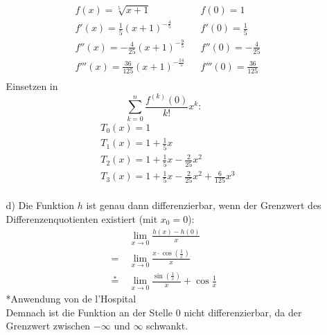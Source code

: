 \documentclass[a4paper,11pt]{article}
\begin{document}
\begin{enumerate}
\begin{enumerate}
                    \begin{align*}
                    &f(x) = \sqrt[5]{x+1} && f(0) = 1 \\
                    &f'(x) = \frac{1}{5}(x+1)^{-\frac{4}{5}} && f'(0) = \frac{1}{5} \\
                    &f''(x) = -\frac{4}{25}(x+1)^{-\frac{9}{5}} && f''(0) = -\frac{4}{25} \\
                    &f'''(x) = \frac{36}{125}(x+1)^{-\frac{14}{5}} && f'''(0) = \frac{36}{125} \\
                    \end{align*}
                    Einsetzen in $$\sum_{k=0}^{n} \frac{f^{(k)}(0)}{k!}x^k:$$ 
                    \begin{align*}
                    &T_0(x) = 1 \\
                    &T_1(x) = 1 + \frac{1}{5}x \\
                    &T_2(x) = 1 + \frac{1}{5}x -\frac{2}{25}x^2 \\
                    &T_3(x) = 1 + \frac{1}{5}x -\frac{2}{25}x^2 + \frac{6}{125}x^3 \\
                    \end{align*}
                \item[d)]
                    Die Funktion $h$ ist genau dann differenzierbar, wenn der Grenzwert des Differenzenquotienten existiert (mit $x_0=0$):
                    \begin{align*}
                        &\underset{x \to 0}{\lim} \frac{h(x)-h(0)}{x}\\
                        =\ &\underset{x \to 0}{\lim} \frac{x \cdot \cos(\frac{1}{x})}{x}\\
                        \overset{*}{=}\ &\underset{x \to 0}{\lim} \frac{\sin(\frac{1}{x})}{x} + \cos{\frac{1}{x}}
                    \end{align*}
                    *Anwendung von de l'Hospital\\
                    Demnach ist die Funktion an der Stelle 0 nicht differenzierbar, da der Grenzwert zwischen $-\infty$ und $\infty$ schwankt.
            \end{enumerate}


\end{enumerate}
\end{document}
